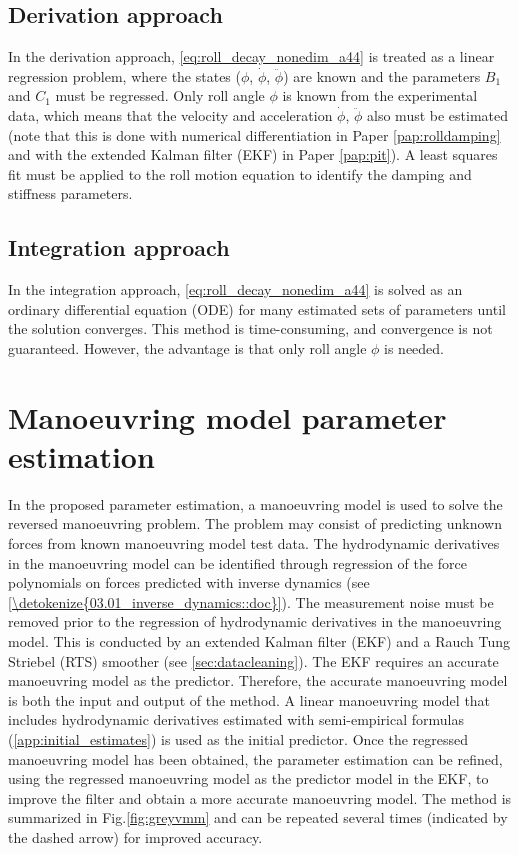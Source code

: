 \subsection{Derivation approach}\label{sec:derivation_approach}
In the derivation approach, \autoref{eq:roll_decay_nonedim_a44} is treated as a linear regression problem, where the states ($\phi$, $\dot{\phi}$, $\ddot{\phi}$) are known and the parameters $B_1$ and $C_1$ must be regressed. Only roll angle $\phi$ is known from the experimental data, which means that the velocity and acceleration $\dot{\phi}$, $\ddot{\phi}$ also must be estimated (note that this is done with numerical differentiation in Paper \ref{pap:rolldamping} and with the extended Kalman filter (EKF) in Paper \ref{pap:pit}).
A least squares fit must be applied to the roll motion equation to identify the damping and stiffness parameters.

\subsection{Integration approach}\label{sec:integration_approach}
In the integration approach, \autoref{eq:roll_decay_nonedim_a44} is solved as an ordinary differential equation (ODE) for many estimated sets of parameters until the solution converges. This method is time-consuming, and convergence is not guaranteed. However, the advantage is that only roll angle $\phi$ is needed.

\section{Manoeuvring model parameter estimation} \label{sec:_VMM}
In the proposed parameter estimation, a manoeuvring model is used to solve the reversed manoeuvring problem. The problem may consist of predicting unknown forces from known manoeuvring model test data. The hydrodynamic derivatives in the manoeuvring model can be identified through regression of the force polynomials on forces predicted with inverse dynamics (see \autoref{\detokenize{03.01_inverse_dynamics::doc}}).
The measurement noise must be removed prior to the regression of hydrodynamic derivatives in the manoeuvring model. This is conducted by an extended Kalman filter (EKF) and a Rauch Tung Striebel (RTS) smoother (see \autoref{sec:datacleaning}). The EKF requires an accurate manoeuvring model as the predictor.
Therefore, the accurate manoeuvring model is both the input and output of the method. A linear manoeuvring model that includes hydrodynamic derivatives estimated with semi-empirical formulas (\autoref{app:initial_estimates}) is used as the initial predictor. Once the regressed manoeuvring model has been obtained, the parameter estimation can be refined, using the regressed manoeuvring model as the predictor model in the EKF, to improve the filter and obtain a more accurate manoeuvring model. The method is summarized in Fig.\ref{fig:greyvmm} and can be repeated several times (indicated by the dashed arrow) for improved accuracy. 

